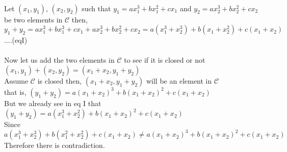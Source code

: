 \documentclass{article}
\begin{document}
\begin{enumerate}
\\
Let $(x_1,y_1)$, $(x_2,y_2)$ such that $y_1=ax_1^3+bx_1^2+cx_1$ and $y_2=ax_2^3+bx_2^2+cx_2$ be two elements in $\mathcal{C}$ 
then,\\
$y_1+y_2=ax_1^3+bx_1^3+cx_1+ax_2^3+bx_2^2+cx_2=a(x_1^3+x_2^3)+b(x_1+x_2^2)+c(x_1+x_2)$ ....(eqI)\\\\
Now let us add the two elements in $\mathcal{C}$ to see if it is closed or not\\
$(x_1,y_1)+(x_2,y_2) =(x_1+x_2,y_1+y_2)$\\
Assume $\mathcal{C}$ is closed then, 
$(x_1+x_2,y_1+y_2)$ will be an element in $\mathcal{C}$\\
that is, $(y_1+y_2)=a(x_1+x_2)^3+b(x_1+x_2)^2+c(x_1+x_2)$ \\
But we already see in eq I that $ (y_1+y_2)=a(x_1^3+x_2^2)+b(x_1+x_2)^2+c(x_1+x_2)$\\
Since $a(x_1^3+x_2^3)+b(x_1^2+x_2^2)+c(x_1+x_2) \neq a(x_1+x_2)^3+b(x_1+x_2)^2+c(x_1+x_2)$\\
Therefore there is contradiction. 






\end{enumerate} 
\end{document}
